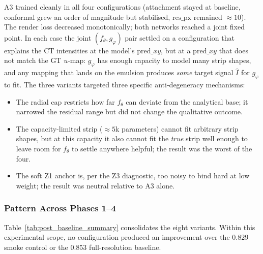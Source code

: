 \documentclass[11pt,a4paper]{article}
\begin{document}
A3 trained cleanly in all four configurations (attachment stayed at baseline, conformal grew an order of magnitude but stabilised, $\mathrm{res\_px}$ remained $\approx 10$). The render loss decreased monotonically; both networks reached a joint fixed point. In each case the joint $(f_\theta, g_\varphi)$ pair settled on a configuration that explains the CT intensities at the model's $\mathrm{pred}\_xy$, but at a $\mathrm{pred}\_xy$ that does not match the GT $u$-map: $g_\varphi$ has enough capacity to model many strip shapes, and any mapping that lands on the emulsion produces \emph{some} target signal $\hat I$ for $g_\varphi$ to fit. The three variants targeted three specific anti-degeneracy mechanisms:
\begin{itemize}
\item The radial cap restricts how far $f_\theta$ can deviate from the analytical base; it narrowed the residual range but did not change the qualitative outcome.
\item The capacity-limited strip ($\approx 5$k parameters) cannot fit arbitrary strip shapes, but at this capacity it also cannot fit the \emph{true} strip well enough to leave room for $f_\theta$ to settle anywhere helpful; the result was the worst of the four.
\item The soft Z1 anchor is, per the Z3 diagnostic, too noisy to bind hard at low weight; the result was neutral relative to A3 alone.
\end{itemize}

\subsubsection{Pattern Across Phases 1--4}
\label{sec:post_baseline_pattern}

Table~\ref{tab:post_baseline_summary} consolidates the eight variants. Within this experimental scope, no configuration produced an improvement over the $0.829$ smoke control or the $0.853$ full-resolution baseline.
\end{document}
